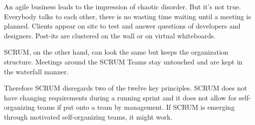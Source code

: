 An agile business leads to the impression of chaotic disorder. But it's not true. Everybody talks to each other, there is no wasting time waiting until a meeting is planned. Clients appear on site to test and answer questions of developers and designers. Post-its are clustered on the wall or on virtual whiteboards. 

SCRUM, on the other hand, can look the same but keeps the organization structure. Meetings around the SCRUM Teams stay untouched and are kept in the waterfall manner.

Therefore SCRUM disregards two of the twelve key principles. SCRUM does not have changing requirements during a running sprint and it does not allow for self-organizing teams if put onto a team by management. If SCRUM is emerging through motivated self-organizing teams, it might work. 